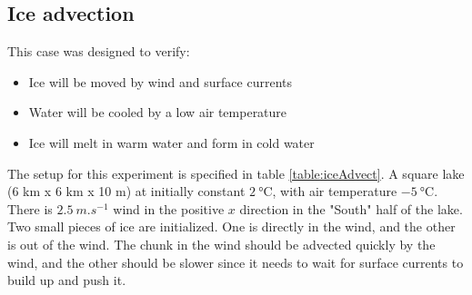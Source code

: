 \documentclass[11pt]{article}
\begin{document}
\subsection{Ice advection}
This case was designed to verify:
\begin{itemize}
\item{Ice will be moved by wind and surface currents}
\item{Water will be cooled by a low air temperature}
\item{Ice will melt in warm water and form in cold water}
\end{itemize}
The setup for this experiment is specified in table \ref{table:iceAdvect}. A square lake (6 km x 6 km x 10 m) at initially constant $\SI{2}{\celsius}$, with air temperature $\SI{-5}{\celsius}$. There is $\SI{2.5}{m.s^{-1}}$ wind in the positive $x$ direction in the "South" half of the lake. Two small pieces of ice are initialized. One is directly in the wind, and the other is out of the wind. The chunk in the wind should be advected quickly by the wind, and the other should be slower since it needs to wait for surface currents to build up and push it.
\end{document}
